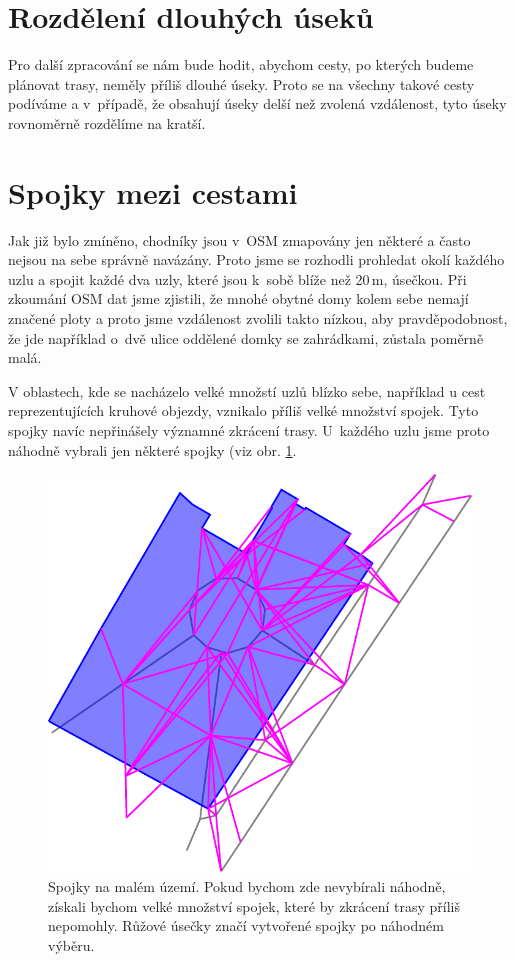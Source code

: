 \section{Rozdělení dlouhých úseků}
Pro další zpracování se nám bude hodit, abychom cesty, po kterých budeme
plánovat trasy, neměly příliš dlouhé úseky. Proto se na všechny takové cesty
podíváme a v~případě, že obsahují úseky delší než zvolená vzdálenost, tyto úseky
rovnoměrně rozdělíme na kratší. 

\section{Spojky mezi cestami}
Jak již bylo zmíněno, chodníky jsou v~OSM zmapovány jen některé a často nejsou
na sebe správně navázány. Proto jsme se rozhodli prohledat okolí každého uzlu a
spojit každé dva uzly, které jsou k~sobě blíže než 20\,m, úsečkou. Při zkoumání
OSM dat jsme zjistili, že mnohé obytné domy kolem sebe nemají značené ploty a
proto jsme vzdálenost zvolili takto nízkou, aby pravděpodobnost, že
jde například o~dvě ulice oddělené domky se zahrádkami, zůstala poměrně malá.  

V oblastech, kde se nacházelo velké množstí uzlů blízko sebe, například u cest
reprezentujících kruhové objezdy, vznikalo příliš velké množství spojek. Tyto
spojky navíc nepřinášely významné zkrácení trasy. U~každého uzlu jsme proto
náhodně vybrali jen některé spojky (viz obr. \ref{fig:spojky}.

\begin{figure}[h]
	\centering
	\includegraphics{../img/spojky.pdf}
	\caption{Spojky na malém území. Pokud bychom zde nevybírali náhodně, získali
	bychom velké množství spojek, které by zkrácení trasy příliš nepomohly.
	Růžové úsečky značí vytvořené spojky po náhodném výběru.}
	\label{fig:spojky}
\end{figure}

